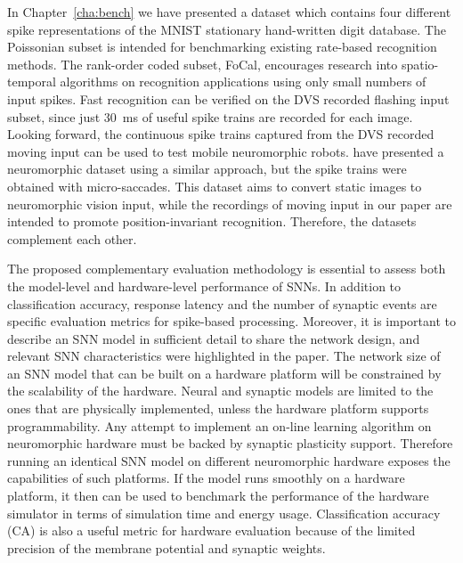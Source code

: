 %
In Chapter~\ref{cha:bench} we have presented a dataset which contains four different spike representations of the MNIST stationary hand-written digit database. %
The Poissonian subset is intended for benchmarking existing rate-based recognition methods.
The rank-order coded subset, FoCal, encourages research into spatio-temporal algorithms on recognition applications using only small numbers of input spikes.
Fast recognition can be verified on the DVS recorded flashing input subset, since just 30~ms of useful spike trains are recorded for each image.
Looking forward, the continuous spike trains captured from the DVS recorded moving input can be used to test mobile neuromorphic robots.
\cite{orchard2015convert} have presented a neuromorphic dataset using a similar approach, but the spike trains were obtained with micro-saccades.
This dataset aims to convert static images to neuromorphic vision input, while the recordings of moving input in our paper are intended to promote position-invariant recognition.
Therefore, the datasets complement each other.

The proposed complementary evaluation methodology is essential to assess both the model-level and hardware-level performance of SNNs.
In addition to classification accuracy, response latency and the number of synaptic events are specific evaluation metrics for spike-based processing.
Moreover, it is important to describe an SNN model in sufficient detail to share the network design, and relevant SNN characteristics were highlighted in the paper.  
The network size of an SNN model that can be built on a hardware platform will be constrained by the scalability of the hardware.
Neural and synaptic models are limited to the ones that are physically implemented, unless the hardware platform supports programmability.
Any attempt to implement an on-line learning algorithm on neuromorphic hardware must be backed by synaptic plasticity support.
Therefore running an identical SNN model on different neuromorphic hardware exposes the capabilities of such platforms.
If the model runs smoothly on a hardware platform, it then can be used to benchmark the performance of the hardware simulator in terms of simulation time and energy usage.
Classification accuracy (CA) is also a useful metric for hardware evaluation because of the limited precision of the membrane potential and synaptic weights.


